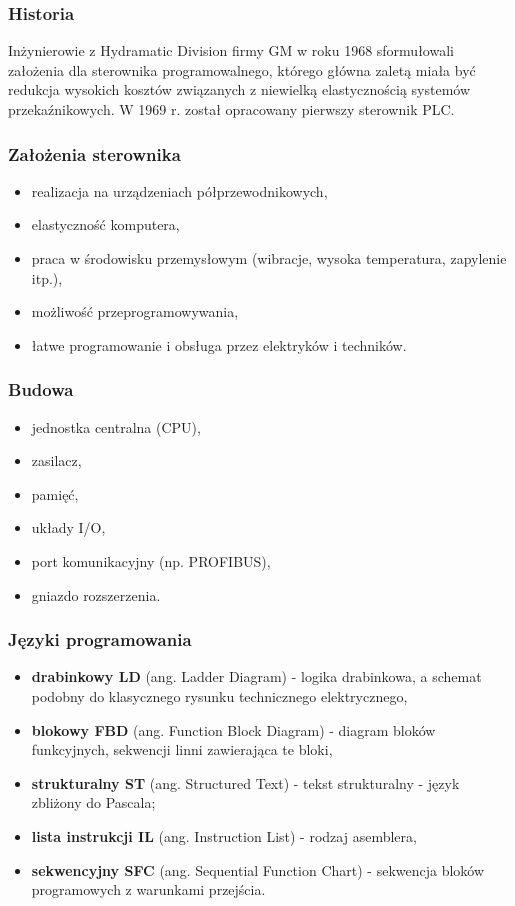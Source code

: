 \documentclass[a4paper,twoside]{report}
\begin{document}
\subsubsection{Historia}
Inżynierowie z Hydramatic Division firmy GM w roku 1968 sformułowali założenia dla sterownika programowalnego, którego główna zaletą miała być redukcja wysokich kosztów związanych z niewielką elastycznością systemów przekaźnikowych. W 1969 r. został opracowany pierwszy sterownik PLC.

\subsubsection{Założenia sterownika}
\begin{itemize}
\item realizacja na urządzeniach półprzewodnikowych,
\item elastyczność komputera,
\item praca w środowisku przemysłowym (wibracje, wysoka temperatura, zapylenie itp.),
\item możliwość przeprogramowywania,
\item łatwe programowanie i obsługa przez elektryków i techników.
\end{itemize}

\subsubsection{Budowa}
\begin{itemize}
\item jednostka centralna (CPU),
\item zasilacz,
\item pamięć,
\item układy I/O,
\item port komunikacyjny (np. PROFIBUS),
\item gniazdo rozszerzenia.
\end{itemize}

\subsubsection{Języki programowania}
\begin{itemize}
\item \textbf{drabinkowy LD} (ang. Ladder Diagram) - logika drabinkowa, a schemat podobny do klasycznego rysunku technicznego elektrycznego,
\item \textbf{blokowy FBD} (ang. Function Block Diagram) - diagram bloków funkcyjnych, sekwencji linni zawierająca te bloki,
\item \textbf{strukturalny ST} (ang. Structured Text) - tekst strukturalny - język zbliżony do Pascala;
\item \textbf{lista instrukcji IL} (ang. Instruction List) - rodzaj asemblera,
\item \textbf{sekwencyjny SFC} (ang. Sequential Function Chart) - sekwencja bloków programowych z warunkami przejścia.
\end{itemize}
\end{document}
